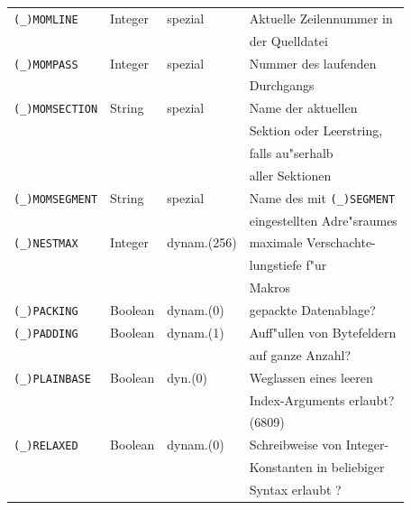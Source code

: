 \documentclass[12pt,a4paper,twoside]{report}
\newcommand{\predefsym}[1]{{\tt (\_)#1}}
\begin{document}
\begin{center}
\begin{longtable}{|l|l|l|l|}
\hline
\predefsym{MOMLINE}    &  Integer    & spezial    & Aktuelle Zeilennummer in \\
                       &             &            & der Quelldatei \\
\hline
\predefsym{MOMPASS}    &  Integer    & spezial    & Nummer des laufenden \\
                       &             &            & Durchgangs \\
\hline
\predefsym{MOMSECTION} &  String     & spezial    & Name der aktuellen \\
                       &             &            & Sektion oder Leerstring, \\
                       &             &            & falls au"serhalb \\
                       &             &            & aller Sektionen \\
\hline
\predefsym{MOMSEGMENT} &  String     & spezial    & Name des mit \predefsym{SEGMENT} \\
                       &             &            & eingestellten Adre"sraumes \\
\hline
\predefsym{NESTMAX}    &  Integer    & dynam.(256)& maximale Verschachte- \\
                       &             &            & lungstiefe f"ur \\
                       &             &            & Makros \\
\hline
\predefsym{PACKING}    &  Boolean    & dynam.(0)  & gepackte Datenablage? \\
\hline
\predefsym{PADDING}    &  Boolean    & dynam.(1)  & Auff"ullen von Bytefeldern \\
                       &             &            & auf ganze Anzahl? \\
\hline
\predefsym{PLAINBASE}  &  Boolean    & dyn.(0)    & Weglassen eines leeren \\
                       &             &            & Index-Arguments erlaubt? \\
                       &             &            & (6809) \\
\hline
\predefsym{RELAXED}    &  Boolean    & dynam.(0)  & Schreibweise von Integer- \\
                       &             &            & Konstanten in beliebiger \\
                       &             &            & Syntax erlaubt ? \\
\hline

\end{longtable}
\end{center}
\end{document}
